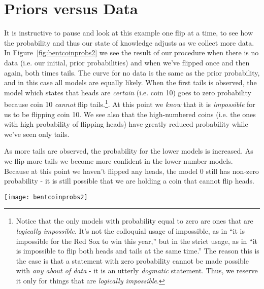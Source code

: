 \section{Priors versus Data}

It is instructive to pause and look at this example one flip at a time, to see how the probability and thus our state of knowledge adjusts as we collect more data.  In Figure~\ref{fig:bentcoinprobs2} we see the result of our procedure when there is no data (i.e. our initial, prior probabilities) and when we've flipped once and then again, both times tails.  The curve for no data is the same as the prior probability, and in this case all models are equally likely.  When the first tails is observed, the model which states that heads are {\em certain} (i.e. coin 10) goes to zero probability because coin 10 \emph{cannot} flip tails.\footnote{Notice that the only models with probability equal to zero are ones that are \emph{logically impossible}.  It's not the colloquial usage of impossible, as in ``it is impossible for the Red Sox to win this year,'' but in the strict usage, as in ``it is impossible to flip both heads and tails at the same time.''  The reason this is the case is that a statement with zero probability cannot be made possible with \emph{any about of data} - it is an utterly \emph{dogmatic} statement.  Thus, we reserve it only for things that are \emph{logically impossible}.
}.  At this point we {\em know} that it is {\em impossible} for us to be flipping coin 10.  We see also that the high-numbered coins (i.e. the ones with high probability of flipping heads) have greatly reduced probability while we've seen only tails.

As more tails are observed, the probability for the lower models is increased.  As we flip more tails we become more confident in the lower-number models.  Because at this point we haven't flipped any heads, the model 0 still has non-zero probability - it is still possible that we are holding a coin that cannot flip heads.

\begin{figure*}
\texttt{[image: bentcoinprobs2]}
\label{fig:bentcoinprobs2}
\caption{Probability for different bent-coin models, given no data (left), the first tails (middle), and the second tails (right).  The curve for no data is the same as the prior probability, and in this case all models are equally likely.  When the first tails is observed, the model which states that heads are {\em certain} (coin 10) goes to zero probability.  As more tails are observed, the probability for the lower models is increased.}
\end{figure*}

